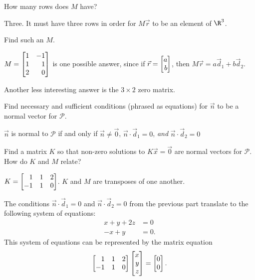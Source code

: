	\begin{parts}
		\item How many rows does $M$ have?
			\begin{solution}
				Three. It must have three rows in order for $M\vec r$ to be an
				element of $\R^3$.
			\end{solution}
		\item Find such an $M$.
			\begin{solution}
				$M=\mat{1&-1\\1&1\\2&0}$ is one possible answer, since if
				$\vec r = \mat{a\\b}$, then $M \vec r = a \vec d_1 + b \vec d_2$.

				Another less interesting answer is the $3\times2$ zero matrix.
			\end{solution}
		\item Find necessary and sufficient conditions (phrased as equations) for
			$\vec n$ to be a normal vector for $\mathcal P$.
			\begin{solution}
				$\vec n$ is normal to $\mathcal P$ if and only if $\vec n\neq \vec 0$,
				$\vec n\cdot\vec d_1=0$, \emph{and} $\vec n\cdot\vec d_2=0$
			\end{solution}
		\item Find a matrix $K$ so that non-zero solutions to $K\vec x=\vec 0$ are normal
			vectors for $\mathcal P$. How do $K$ and $M$ relate?
			\begin{solution}
				$K = \mat{1&1&2\\-1&1&0}$. $K$ and $M$ are transposes of
				one another.

				The conditions $\vec n\cdot\vec d_1=0$ and $\vec n\cdot\vec d_2=0$
				from the previous part translate to the following system of equations:
				\begin{align*}
					x + y + 2z &= 0 \\
					-x + y &= 0.
				\end{align*}
				This system of equations can be represented by the matrix equation
				\[
					\mat{1&1&2\\-1&1&0}\mat{x\\y\\z} = \mat{0\\0}.
				\]
			\end{solution}
	\end{parts}


